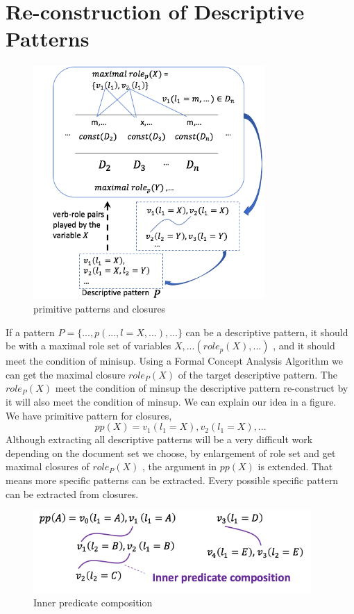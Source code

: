 \section{Re-construction of Descriptive Patterns}
\begin{figure}[!h]
\centering
\includegraphics[width=250pt]{./pictures/0306.png}
\caption{primitive patterns and closures}
\end{figure}
If a pattern $P  = \{...,p(...,l = X,...),...\}$ can be a descriptive pattern, it should be with a maximal role set of variables $X,...(role_p (X),...)$ , and it should meet the condition of minisup. Using a Formal Concept Analysis Algorithm we can get the maximal closure $role_P (X)$ of the target descriptive pattern. The $role_P (X)$ meet the condition of minsup the descriptive pattern re-construct by it will also meet the condition of minsup. We can explain our idea in a figure.\\
We  have primitive pattern for closures,
\begin{displaymath}
pp(X) = v_1(l_1 = X), v_2(l_1 = X),...
\end{displaymath}
Although extracting all descriptive patterns will be a very difficult work depending on the document set we choose, by enlargement of role set and get maximal closures of $role_P (X)$ , the argument in $pp(X)$ is extended. That means more specific patterns can be extracted. Every possible specific pattern can be extracted from closures.\\
\begin{figure}[!h]
\centering
\includegraphics[width=300pt]{./pictures/0306-1.png}
\caption{Inner predicate composition}
\end{figure}
